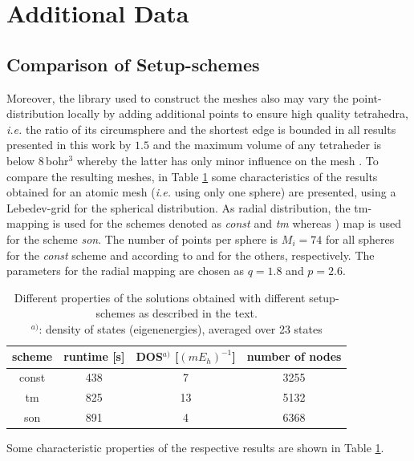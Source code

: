 \section{Additional Data}
\subsection{Comparison of Setup-schemes}
\label{app:CompSetup}
Moreover, the library  \cite{tetgen} used to construct the meshes also may vary the point-distribution locally by adding additional points to ensure high quality tetrahedra, \textit{i.e.} the ratio of its circumsphere and the shortest edge is bounded in all results presented in this work by $1.5$ and the maximum volume of any tetraheder is below $8\,$bohr$^3$ whereby the latter has only minor influence on the mesh \cite{tetgen}.
To compare the resulting meshes, in Table \ref{tab:RadScheme} some characteristics of the results obtained for an atomic mesh (\textit{i.e.} using only one sphere) are presented, using a Lebedev-grid \cite{lebedev} for the spherical distribution.
As radial distribution, the tm-mapping  is used for the schemes denoted as \textit{const} and \textit{tm} whereas ) map is used for the scheme \textit{son}.
The number of points per sphere is $M_i=74$ for all spheres for the \textit{const} scheme and according to  and  for the others, respectively.
The parameters for the radial mapping are chosen as $q=1.8$ and $p=2.6$.
\begin{table}
\begin{tabular}{|c|c|c|c|}
\hline
scheme & runtime [s] & DOS$^{a)}$ [$(m E_h)^{-1}$] & number of nodes\\
\hline
const   &  438   &    7    &   3255 \\
tm      &  825   &    13   &   5132 \\
son     &  891   &    4    &   6368 \\
\hline
\end{tabular}
\caption{ Different properties of the solutions obtained with different setup-schemes as described in the text.\\
$^{a)}$: density of states (eigenenergies), averaged over 23 states}
\label{tab:RadScheme}
\end{table}
Some characteristic properties of the respective results are shown in Table \ref{tab:RadScheme}.
